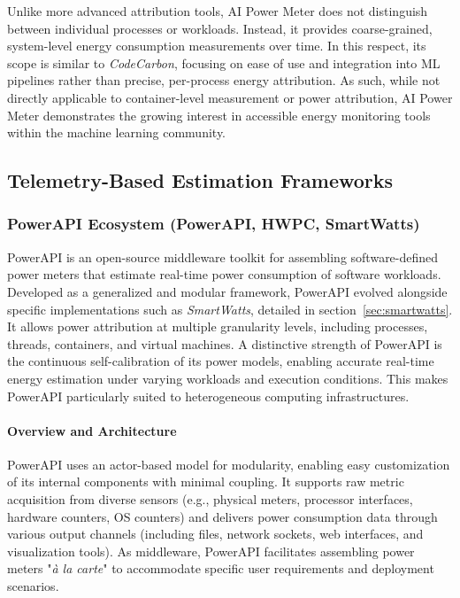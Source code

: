 Unlike more advanced attribution tools, AI Power Meter does not distinguish between individual processes or workloads. Instead, it provides coarse-grained, system-level energy consumption measurements over time. In this respect, its scope is similar to \textit{CodeCarbon}, focusing on ease of use and integration into ML pipelines rather than precise, per-process energy attribution. As such, while not directly applicable to container-level measurement or power attribution, AI Power Meter demonstrates the growing interest in accessible energy monitoring tools within the machine learning community.

\subsection{Telemetry-Based Estimation Frameworks}
\label{sec:telemetry-tools}

\subsubsection{PowerAPI Ecosystem\parencite{powerapi2024github} (PowerAPI, HWPC, SmartWatts)}
\label{sec:powerApiFramework}

PowerAPI\parencite{fieni2024powerapi} is an open-source middleware toolkit for assembling software-defined power meters that estimate real-time power consumption of software workloads. Developed as a generalized and modular framework, PowerAPI evolved alongside specific implementations such as \textit{SmartWatts}, detailed in section~\ref{sec:smartwatts}. It allows power attribution at multiple granularity levels, including processes, threads, containers, and virtual machines. A distinctive strength of PowerAPI is the continuous self-calibration of its power models, enabling accurate real-time energy estimation under varying workloads and execution conditions. This makes PowerAPI particularly suited to heterogeneous computing infrastructures.

\paragraph{Overview and Architecture}

PowerAPI uses an actor-based model for modularity, enabling easy customization of its internal components with minimal coupling. It supports raw metric acquisition from diverse sensors (e.g., physical meters, processor interfaces, hardware counters, OS counters) and delivers power consumption data through various output channels (including files, network sockets, web interfaces, and visualization tools). As middleware, PowerAPI facilitates assembling power meters "\textit{à la carte}" to accommodate specific user requirements and deployment scenarios.

